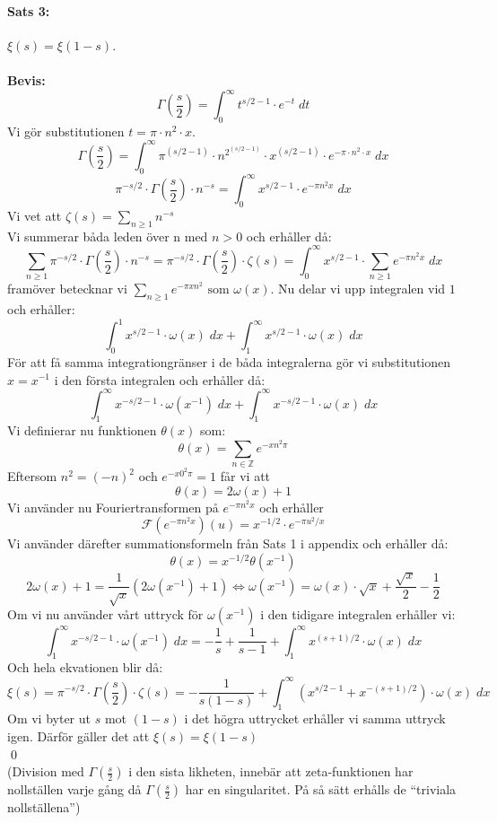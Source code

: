 \documentclass{article}%
\begin{document}
\paragraph{Sats 3:} $\xi(s) = \xi(1 - s)$. \\
\\
{\bf Bevis:}\\
$$\Gamma(\frac s 2) = \int_0^\infty t^{s/2 - 1} \cdot e^{-t}\; dt$$
Vi gör substitutionen $t = \pi \cdot n^2 \cdot x$.
$$\Gamma(\frac s 2) = \int_0^\infty \pi^{(s/2 - 1)} \cdot n^{2^{(s / 2 - 1)}} \cdot x^{(s/2 - 1)} \cdot e^{-\pi \cdot
n^2 \cdot x}\; dx$$
$$\pi^{-s/2} \cdot \Gamma(\frac s 2) \cdot n^{-s} = \int_0^\infty x^{s/2 - 1} \cdot e^{-\pi n^2 x}\; dx$$
Vi vet att $\zeta(s) = \sum\limits_{n \ge 1} n^{-s}$\\
Vi summerar båda leden över n med $n>0$ och erhåller då:\\
$$\sum_{n \ge 1} \pi^{-s/2} \cdot \Gamma(\frac s 2) \cdot n^{-s} = \pi^{-s/2} \cdot \Gamma(\frac s 2) \cdot \zeta(s) = 
\int_0^\infty x^{s/2 - 1} \cdot \sum_{n \ge 1} e^{-\pi n^2 x}\; dx$$
framöver betecknar vi $\sum\limits_{n \ge 1} e^{-\pi x n^2} \text{ som } \omega(x)$.
Nu delar vi upp integralen vid $1$ och erhåller:%
$$\int_0^1 x^{s/2 - 1} \cdot \omega(x)\; dx + \int_1^\infty x^{s/2 - 1} \cdot \omega(x)\; dx$$
För att få samma integrationgränser i de båda integralerna gör vi substitutionen $x = x^{-1}$ i den första integralen och erhåller då:
$$\int_1^\infty x^{-s/2 - 1} \cdot \omega(x^{-1})\; dx + \int_1^\infty x^{-s/2 - 1} \cdot \omega(x)\; dx$$
Vi definierar nu funktionen $\theta(x)$ som:
$$\theta(x) = \sum_{n \in \mathbb{Z}} e^{-xn^2\pi}$$
Eftersom $n^2=(-n)^2$ och $e^{-x0^2\pi} = 1$ får vi att 
$$\theta(x) = 2\omega(x) + 1$$%
Vi använder nu Fouriertransformen på $e^{-\pi n^2 x}$ och erhåller
$$\mathcal{F}(e^{-\pi n^2 x})(u) = x^{-1/2} \cdot e^{-\pi u^2/x}$$
Vi använder därefter summationsformeln från Sats 1 i appendix och erhåller då:
$$\theta(x) = x^{-1/2}\theta(x^{-1})$$
$$2\omega(x) + 1 = \frac 1 {\sqrt{x}} (2\omega(x^{-1}) + 1) \Leftrightarrow \omega(x^{-1}) = \omega(x) \cdot \sqrt{x} + \frac {\sqrt{x}} 2
- \frac 1 2$$
Om vi nu använder vårt uttryck för $\omega(x^{-1})$ i den tidigare integralen erhåller vi:
$$\int_1^\infty x^{-s/2 - 1} \cdot \omega(x^{-1})\; dx = - \frac 1 s + \frac 1 {s - 1} + \int_1^\infty x^{(s + 1)/2} \cdot \omega(x)\; dx$$
Och hela ekvationen blir då:
$$\xi(s) = \pi^{-s/2} \cdot \Gamma(\frac s 2) \cdot \zeta(s) = - \frac 1 {s(1 - s)} + \int_1^\infty(x^{s/2 - 1} + x^{-(s + 1)/2}) \cdot
\omega(x)\; dx$$
Om vi byter ut $s$ mot $(1 - s)$ i det högra uttrycket erhåller vi samma uttryck igen. Därför gäller det att $\xi(s) = \xi(1 - s)$ \\
\hfill \qed\\
(Division med $\Gamma(\frac s 2 )$ i den sista likheten, innebär att zeta-funktionen har nollställen varje gång då $\Gamma(\frac s 2 )$ har en singularitet. På så sätt erhålls de ``triviala nollställena'')
\\
\end{document}

